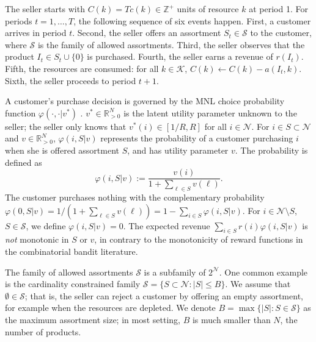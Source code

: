 \documentclass{article}
\theoremstyle{definition}
\newcommand{\KKK}{\mathcal{K}}
\newcommand{\NNN}{\mathcal{N}}
\newcommand{\RRR}{\mathbb{R}}
\newcommand{\SSS}{\mathcal{S}}
\begin{document}
The seller starts with $C(k) = Tc(k)\in \mathbb{Z}^+$ units of resource $k$ at period 1. For periods $t = 1, \ldots, T$, the following sequence of six events happen. First, a customer arrives in period $t$. Second, the seller offers an assortment $S_t \in \SSS$ to the customer, where $\mathcal{S}$ is the family of allowed assortments. Third, the seller observes that the product $I_t \in S_t \cup\{0\}$ is purchased. Fourth, the seller earns a revenue of $r(I_t)$. Fifth, the resources are consumed: for all $k\in \KKK$, $C(k) \leftarrow C(k) - a(I_t, k)$. Sixth, the seller proceeds to period $t+1$.

A customer's purchase decision is governed by the MNL choice probability function $\varphi(\cdot, \cdot | v^*)$ \cite{McFadden74}. $v^*\in \RRR^N_{>0}$ is the latent utility parameter unknown to the seller; the seller only knows that $v^*(i) \in [1/R, R]$ for all $i\in \NNN$. For $i\in S\subset \NNN$ and $v\in \RRR^N_{> 0}$, $\varphi(i, S | v)$ represents the probability of a customer purchasing $i$ when she is offered assortment $S$, and has utility parameter $v$. The probability is defined as
\begin{equation}\label{eq:choiceprobability}
\varphi(i, S|v) := \frac{v(i)}{1 + \sum_{\ell\in S}v(\ell)}. 
\end{equation}
The customer purchases nothing with the complementary probability $\varphi(0, S | v) = 1/(1 + \sum_{\ell\in S}v(\ell)) = 1 - \sum_{i\in S}\varphi(i, S | v).$ 
For $i\in\NNN\setminus S$, $S\in \SSS$, we define $\varphi(i, S| v) = 0$. The expected revenue $\sum_{i\in S}r(i)\varphi(i, S|v)$ is \emph{not} monotonic in $S$ or $v$, in contrary to the monotonicity of reward functions in the combinatorial bandit literature.

The family of allowed assortments $\SSS$ is a subfamily of $2^{\NNN}$. One common example is the cardinality constrained family $\SSS = \{S\subset \NNN: |S|\leq B\}$. We assume that $\emptyset\in \SSS$; that is, the seller can reject a customer by offering an empty assortment, for example when the resources are depleted. We denote $B = \max\{|S|:S\in\SSS\}$ as the maximum assortment size; in most setting, $B$ is much smaller than $N$, the number of products. %

\end{document}
